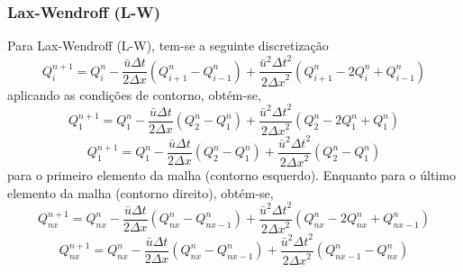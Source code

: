 \subsubsection{Lax-Wendroff (L-W)}
Para Lax-Wendroff (L-W), tem-se a seguinte discretização
\begin{equation}\label{L-W}
    Q_i^{n+1} = Q_i^n - \frac{\bar{u}\Delta t}{2\Delta x}\left(
        Q_{i+1}^n - Q_{i-1}^n
    \right) + \frac{\bar{u}^2{\Delta t}^2}{2{\Delta x}^2}\left(
        Q_{i+1}^n - 2Q_i^n + Q_{i-1}^n
    \right)
\end{equation}
aplicando as condições de contorno, obtém-se,
\[
    Q_1^{n+1} = Q_1^n - \frac{\bar{u}\Delta t}{2\Delta x}\left(
        Q_2^n - Q_1^n
    \right) + \frac{\bar{u}^2{\Delta t}^2}{2{\Delta x}^2}\left(
        Q_2^n - 2Q_1^n + Q_1^n
    \right)
\]
\begin{equation}\label{L-W esq}
    Q_1^{n+1} = Q_1^n - \frac{\bar{u}\Delta t}{2\Delta x}\left(
        Q_2^n - Q_1^n
    \right) + \frac{\bar{u}^2{\Delta t}^2}{2{\Delta x}^2}\left(
        Q_2^n - Q_1^n
    \right)
\end{equation}
para o primeiro elemento da malha (contorno esquerdo). Enquanto para o último
elemento da malha (contorno direito), obtém-se,
\[
    Q_{nx}^{n+1} = Q_{nx}^n - \frac{\bar{u}\Delta t}{2\Delta x}\left(
        Q_{nx}^n - Q_{nx-1}^n
    \right) + \frac{\bar{u}^2{\Delta t}^2}{2{\Delta x}^2}\left(
        Q_{nx}^n - 2Q_{nx}^n + Q_{nx-1}^n
    \right)
\]
\begin{equation}
    Q_{nx}^{n+1} = Q_{nx}^n - \frac{\bar{u}\Delta t}{2\Delta x}\left(
        Q_{nx}^n - Q_{nx-1}^n
    \right) + \frac{\bar{u}^2{\Delta t}^2}{2{\Delta x}^2}\left(
        Q_{nx-1}^n - Q_{nx}^n
    \right)
\end{equation}


